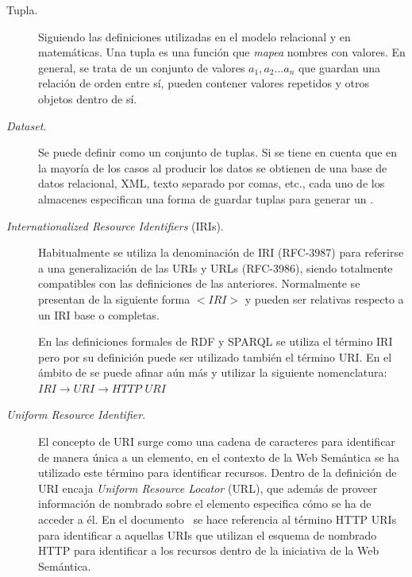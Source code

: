 \begin{description}

 \item [Tupla.] Siguiendo las definiciones utilizadas en el modelo relacional y en matemáticas. Una tupla
es una función que \textit{mapea} nombres con valores. En general, se trata de un conjunto de valores
$a_1,a_2...a_n$ que guardan una relación de orden entre sí, pueden contener valores repetidos y otros objetos dentro de sí.

\item [\textit{Dataset}.] Se puede definir como un conjunto de tuplas. Si se tiene en cuenta que en la mayoría de los
casos al producir \linkeddata los datos se obtienen de una base de datos relacional, \gls{XML}, texto separado por comas, etc., cada uno de los almacenes especifican una forma de guardar tuplas para generar un \dataset.

\item [\textit{Internationalized Resource Identifiers} (\gls{IRI}s).] Habitualmente se utiliza la denominación de IRI (\gls{RFC}-3987) para referirse
a una generalización de las \gls{URI}s y URLs (RFC-3986), siendo totalmente compatibles con las definiciones de las anteriores. 
Normalmente se presentan de la siguiente forma $<IRI>$ y pueden ser relativas respecto a un IRI base o completas.

En las definiciones formales de \gls{RDF} y \gls{SPARQL} se utiliza el término IRI pero por su definición puede ser utilizado
también el término URI. En el ámbito de \linkeddata se puede afinar aún más y utilizar la siguiente nomenclatura:
 $IRI \longrightarrow  URI \longrightarrow  HTTP$ $URI$

\item [\textit{Uniform Resource Identifier}.] El concepto de URI surge como una cadena de caracteres para identificar de manera única
a un elemento, en el contexto de la Web Semántica se ha utilizado este término para identificar recursos. Dentro
de la definición de URI encaja \textit{Uniform Resource Locator} (\gls{URL}), que además de proveer información de nombrado sobre el elemento
especifica cómo se ha de acceder a él. En el documento~\cite{RDF} se hace referencia al término HTTP URIs para identificar
a aquellas URIs que utilizan el esquema de nombrado \gls{HTTP} para identificar a los recursos dentro de la iniciativa de la Web Semántica.


\end{description}
